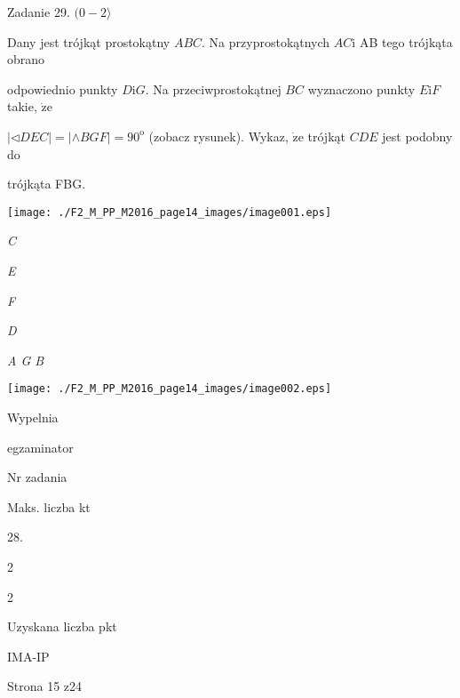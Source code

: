 \documentclass[a4paper,12pt]{article}
\begin{document}
Zadanie 29. $(0-2\rangle$

Dany jest trójkąt prostokątny $ABC$. Na przyprostokątnych $AC\mathrm{i}$ AB tego trójkąta obrano

odpowiednio punkty $D\mathrm{i}G$. Na przeciwprostokątnej $BC$ wyznaczono punkty $E\mathrm{i}F$ takie, $\dot{\mathrm{z}}\mathrm{e}$

$|\triangleleft DEC|=|\wedge BGF|=90^{\mathrm{o}}$ (zobacz rysunek). Wykaz, $\dot{\mathrm{z}}\mathrm{e}$ trójkąt $CDE$ jest podobny do

trójkąta FBG.
\begin{center}
\texttt{[image: ./F2\_M\_PP\_M2016\_page14\_images/image001.eps]}
\end{center}
{\it C}

{\it E}

{\it F}

{\it D}

{\it A  G B}
\begin{center}
\texttt{[image: ./F2\_M\_PP\_M2016\_page14\_images/image002.eps]}
\end{center}
Wypelnia

egzaminator

Nr zadania

Maks. liczba kt

28.

2

2

Uzyskana liczba pkt

IMA-IP

Strona 15 z24
\end{document}

